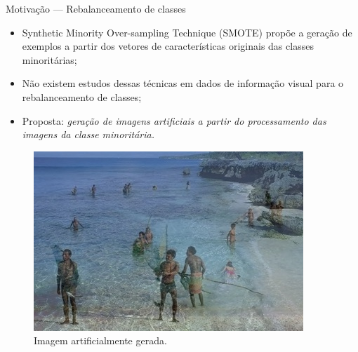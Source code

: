 \documentclass{beamer}
\begin{document}
\begin{frame}{Motivação --- Rebalanceamento de classes}
  \setlength\leftmargini{1em}
  \justifying
  \begin{itemize}
    \item Synthetic Minority Over-sampling Technique (SMOTE) propõe a geração de exemplos a partir dos vetores de características originais das classes minoritárias;
    \item Não existem estudos dessas técnicas em dados de informação visual para o rebalanceamento de classes;
    \item Proposta: \textit{geração de imagens artificiais a partir do processamento das imagens da classe minoritária.}
  \end{itemize}
  \begin{figure}[htbp]
    \begin{center}
      \includegraphics[width=.35\linewidth]{figuras/imagemgerada.jpg}
      \caption{Imagem artificialmente gerada.}
    \end{center}
  \end{figure}
\end{frame}
\end{document}
